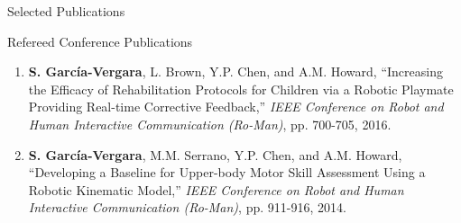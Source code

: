 \documentclass{resume} %
\newcommand{\Sergio}{\textbf{S. Garc\'{i}a-Vergara}}
\newcommand{\SuperPop}{Super Pop VR\textsuperscript{TM}\space}
\begin{document}
\begin{rSection}{Selected Publications}

\begin{rSubsection}{Refereed Conference Publications}{}{}{}
\item
\begin{enumerate}

\iffalse
\item D. Bryant, J. Boyd, J. Harris, M. Smith, \Sergio, Y.P. Chen, and
  A.M. Howard, ``An Infant Smart-Mobile System to Encourage Kicking Movements in
  Infants At-Risk of Cerebral Palsy,'' \textit{IEEE Workshop on Advanced
    Robotics and its Social Impacts (ARSO)}, pp. 1-5, 2017.
\fi

\iffalse
\item \Sergio, P. Robinette, Y.P. Chen, and A.M. Howard, ``Validation of a
  Physical Rehabilitation Game using Markerless versus Marker-based Motion
  Capture Systems,'' \textit{IEEE EMBS Conference}, 2016.
\fi

\item \Sergio, L. Brown, Y.P. Chen, and A.M. Howard, ``Increasing the Efficacy
  of Rehabilitation Protocols for Children via a Robotic Playmate Providing
  Real-time Corrective Feedback,'' \textit{IEEE Conference on Robot and Human
    Interactive Communication (Ro-Man)}, pp. 700-705, 2016.

\iffalse
\item L. Brown, \Sergio, and A.M. Howard, ``Evaluating the Effect of Robot
  Feedback on Motor Skill Performance in Therapy Games,'' \textit{IEEE
    Conference on Systems, Man, and Cybernetics (SMC)}, pp. 1060-1065, 2015.
\fi

\iffalse
\item \Sergio, H. Li, and A.M. Howard, ``Increasing \SuperPop Users' Intrinsic
  Motivation by Improving the Game's Aesthetics,'' \textit{International
    Conference on Universal Access in Human-Computer Interaction}, pp. 432-441,
  2015.
\fi

\item \Sergio, M.M. Serrano, Y.P. Chen, and A.M. Howard, ``Developing a Baseline
  for Upper-body Motor Skill Assessment Using a Robotic Kinematic Model,''
  \textit{IEEE Conference on Robot and Human Interactive Communication
    (Ro-Man)}, pp. 911-916, 2014.

\iffalse
\item \Sergio, and A.M. Howard, ``Three-dimensional Fitts Law Model used to
  Predict Movement Time in Serious Games for Rehabilitation,''
  \textit{International Conference on Virtual, Augmented and Mixed Reality},
  pp. 287-297, 2014.
\fi


\end{enumerate}
\end{rSubsection}
\end{rSection}
\end{document}
